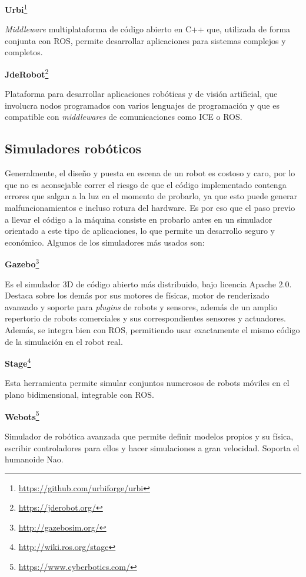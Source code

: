 	\textbf{Urbi}\footnote{\url{https://github.com/urbiforge/urbi}}
	
\textit{Middleware} multiplataforma de código abierto en C++ que, utilizada de forma conjunta con ROS, permite desarrollar aplicaciones para sistemas complejos y completos.

	\textbf{JdeRobot}\footnote{\url{https://jderobot.org/}}
	
Plataforma para desarrollar aplicaciones robóticas y de visión artificial, que involucra nodos programados con varios lenguajes de programación y que es compatible con \textit{middlewares} de comunicaciones como ICE o ROS.

\subsection{Simuladores robóticos}
Generalmente, el diseño y puesta en escena de un robot es costoso y caro, por lo que no es aconsejable correr el riesgo de que el código implementado contenga errores que salgan a la luz en el momento de probarlo, ya que esto puede generar malfuncionamientos e incluso rotura del hardware. Es por eso que el paso previo a llevar el código a la máquina consiste en probarlo antes en un simulador orientado a este tipo de aplicaciones, lo que permite un desarrollo seguro y económico. Algunos de los simuladores más usados son:

	\textbf{Gazebo}\footnote{\url{http://gazebosim.org/}}
	
Es el simulador 3D de código abierto más distribuido, bajo licencia Apache 2.0. Destaca sobre los demás por sus motores de físicas, motor de renderizado avanzado y soporte para \textit{plugins} de robots y sensores, además de un amplio repertorio de robots comerciales y sus correspondientes sensores y actuadores. Además, se integra bien con ROS, permitiendo usar exactamente el mismo código de la simulación en el robot real.

	\textbf{Stage}\footnote{\url{http://wiki.ros.org/stage}}
	
Esta herramienta permite simular conjuntos numerosos de robots móviles en el plano bidimensional, integrable con ROS.

	\textbf{Webots}\footnote{\url{https://www.cyberbotics.com/}}
	
Simulador de robótica avanzada que permite definir modelos propios y su física, escribir controladores para ellos y hacer simulaciones a gran velocidad. Soporta el humanoide Nao. 


